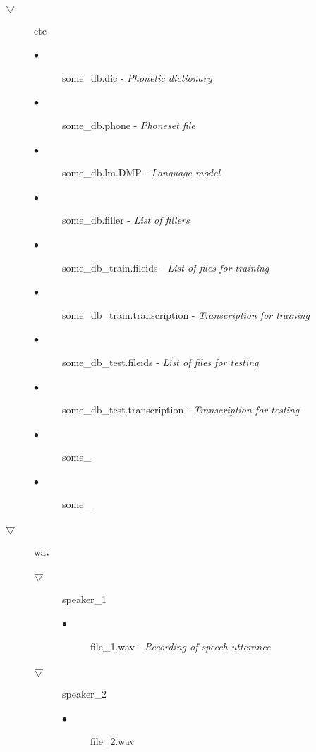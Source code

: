 \documentclass[12pt,a4paper,oldfontcommands]{memoir}
\begin{document}
\begin{description}
 \item[$\bigtriangledown$] etc
	\begin{description}
		\item[$\bullet$] some\_db.dic - \textit{Phonetic dictionary}
		\item[$\bullet$] some\_db.phone - \textit{Phoneset file}
		\item[$\bullet$] some\_db.lm.DMP - \textit{Language model}
		\item[$\bullet$] some\_db.filler - \textit{List of fillers}
		\item[$\bullet$] some\_db\_train.fileids - \textit{List of files for training}
		\item[$\bullet$] some\_db\_train.transcription - \textit{Transcription for training}
		\item[$\bullet$] some\_db\_test.fileids - \textit{List of files for testing}
		\item[$\bullet$] some\_db\_test.transcription - \textit{Transcription for testing}
		\item[$\bullet$] some\_
		\item[$\bullet$] some\_
	\end{description}
 \item[$\bigtriangledown$] wav
	\begin{description}
		\item[$\bigtriangledown$] speaker\_1
			\begin{description}
				\item[$\bullet$] file\_1.wav - \textit{Recording of speech utterance}
			\end{description}
		\item[$\bigtriangledown$] speaker\_2
			\begin{description}
				\item[$\bullet$]file\_2.wav
			\end{description}
	\end{description}	
\end{description}
\end{document}
